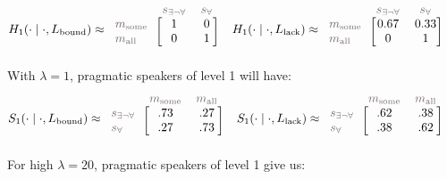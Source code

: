 \documentclass[a4paper, 11pt]{article}
\theoremstyle{Satz}
\newcommand{\state}{\ensuremath{s}\xspace}		%
\newcommand{\mystate}[1]{\ensuremath{\state_{\text{#1}}}\xspace} %
\newcommand{\mylang}[1]{\ensuremath{L_{\text{#1}}}\xspace} %
\newcommand{\messg}{\ensuremath{m}\xspace}		%
\newcommand{\mymessg}[1]{\ensuremath{\messg_{\text{#1}}}\xspace} %
\newcommand{\ssome}{\mystate{\ensuremath{\exists\neg\forall}}}
\newcommand{\sall}{\mystate{\ensuremath{\forall}}}
\newcommand{\msome}{\mymessg{some}}
\newcommand{\mall}{\mymessg{all}}
\newcommand{\Lbound}{\mylang{bound}}
\newcommand{\Llack}{\mylang{lack}}
\newcommand{\mygray}[1]{{\textcolor{mygray}{#1}}}
\begin{document}
\begin{align*}
  H_1(\cdot \mid \cdot, \Lbound) & \approx \begin{blockarray}{lcc}
    & \mygray{\ssome} & \mygray{\sall} \\
    \begin{block}{l[cc]}
      \mygray{\msome} & 1 & 0 \\
      \mygray{\mall}  & 0 & 1 \\
    \end{block}
  \end{blockarray} &
  H_1(\cdot \mid \cdot, \Llack) & \approx \begin{blockarray}{lcc}
    & \mygray{\ssome} & \mygray{\sall} \\
    \begin{block}{l[cc]}
      \mygray{\msome} & 0.67 & 0.33 \\
      \mygray{\mall}  & 0 & 1 \\
    \end{block}
  \end{blockarray} 
\end{align*}
With $\lambda = 1$, pragmatic speakers of level 1 will have:
\begin{align*}
  S_1(\cdot \mid \cdot, \Lbound) & \approx \begin{blockarray}{lcc}
    & \mygray{\msome} & \mygray{\mall} \\
    \begin{block}{l[cc]}
      \mygray{\ssome} & .73 & .27 \\
      \mygray{\sall}  & .27 & .73 \\
    \end{block}
  \end{blockarray} &
  S_1(\cdot \mid \cdot, \Llack) & \approx \begin{blockarray}{lcc}
    & \mygray{\msome} & \mygray{\mall} \\
    \begin{block}{l[cc]}
      \mygray{\ssome} & .62 & .38 \\
      \mygray{\sall}  & .38 & .62 \\
    \end{block}
  \end{blockarray} 
\end{align*}
For high $\lambda = 20$, pragmatic speakers of level 1 give us:
\end{document}
